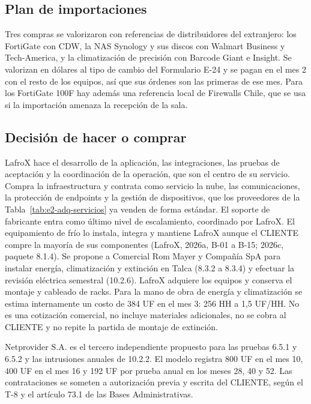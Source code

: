 \subsection{Plan de importaciones}
\label{sec:e2-adq-importaciones}

Tres compras se valorizaron con referencias de distribuidores del extranjero: los FortiGate con CDW, la NAS Synology y sus discos con Walmart Business y Tech-America, y la climatización de precisión con Barcode Giant e Insight. Se valorizan en dólares al tipo de cambio del Formulario E-24 y se pagan en el mes 2 con el resto de los equipos, así que sus órdenes son las primeras de ese mes. Para los FortiGate 100F hay además una referencia local de Firewalls Chile, que se usa si la importación amenaza la recepción de la sala.

\subsection{Decisión de hacer o comprar}
\label{sec:e2-adq-hacer-comprar}

LafroX hace el desarrollo de la aplicación, las integraciones, las pruebas de aceptación y la coordinación de la operación, que son el centro de su servicio. Compra la infraestructura y contrata como servicio la nube, las comunicaciones, la protección de endpoints y la gestión de dispositivos, que los proveedores de la Tabla~\ref{tab:e2-adq-servicios} ya venden de forma estándar. El soporte de fabricante entra como último nivel de escalamiento, coordinado por LafroX. El equipamiento de frío lo instala, integra y mantiene LafroX aunque el CLIENTE compre la mayoría de sus componentes (LafroX, 2026a, B-01 a B-15; 2026c, paquete 8.1.4). Se propone a Comercial Rom Mayer y Compañía SpA para instalar energía, climatización y extinción en Talca (8.3.2 a 8.3.4) y efectuar la revisión eléctrica semestral (10.2.6). LafroX adquiere los equipos y conserva el montaje y cableado de racks. Para la mano de obra de energía y climatización se estima internamente un costo de 384 UF en el mes 3: 256 HH a 1,5 UF/HH. No es una cotización comercial, no incluye materiales adicionales, no se cobra al CLIENTE y no repite la partida de montaje de extinción.

Netprovider S.A. es el tercero independiente propuesto para las pruebas 6.5.1 y 6.5.2 y las intrusiones anuales de 10.2.2. El modelo registra 800 UF en el mes 10, 400 UF en el mes 16 y 192 UF por prueba anual en los meses 28, 40 y 52. Las contrataciones se someten a autorización previa y escrita del CLIENTE, según el T-8 y el artículo 73.1 de las Bases Administrativas.
